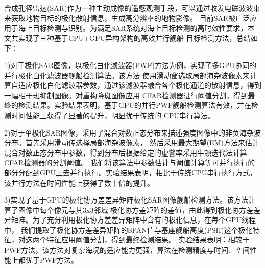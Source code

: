 \begin{cabstract}
  合成孔径雷达(SAR)作为一种主动成像的遥感观测手段，可以通过收发电磁波波束来获取地物目标的极化散射信息，生成高分辨率的地物影像。
  目前SAR被广泛应用于海上目标检测与识别。为满足SAR系统对海上目标检测的高时效性要求，本文共实现了三种基于CPU+GPU异构架构的高效并行舰船
  目标检测方法，总结如下：

  1)对于极化SAR图像，以极化白化滤波器(PWF)方法为例，实现了多GPU协同的并行极化白化滤波器舰船检测算法。该方法
  使用滑动窗选取局部海杂波像素来计算自适应极化白化滤波器参数，通过该滤波器融合各个极化通道的散射信息，得到一幅相干斑抑制图像。对重构降斑图像应用
  CFAR检测器进行阈值分割，得到最终的检测结果。实验结果表明，基于GPU的并行PWF舰船检测算法有效，并在检测时间性能上获得了显著的提升，明显优于传统的
  CPU串行算法。

  2)对于单极化SAR图像，采用了混合对数正态分布来描述强度图像中的非负海杂波分布。首先采用滑动传选择局部海杂波像素，
  然后采用最大期望(EM)方法来估计混合对数正态分布中参数，得到分布后根据给定的虚警率采用牛顿迭代法计算CFAR检测器的分割阈值。
  我们将该算法中参数估计与阈值计算等可并行执行的部分分配到GPU上去并行执行。实验结果表明，相比于传统CPU串行执行方式，
  该并行方法在时间性能上获得了数十倍的提升。

  3)实现了基于GPU的极化协方差差异矩阵极化SAR图像舰船检测方法。该方法计算了图像中每个像元与其3x3邻域
  极化协方差矩阵的差值，由此得到极化协方差差异矩阵。为了充分利用极化协方差差异矩阵中含有的极化信息，在每个GPU线程中，
  我们提取了极化协方差差异矩阵的SPAN值与基座舰船高度(PSH)这个极化特征，对这两个特征应用阈值分割，得到最终检测结果。
  实验结果表明：相较于PWF方法，该方法对复杂海况的适应能力更强，算法在检测精度与时间、空间性能上都优于PWF方法。

\end{cabstract}


